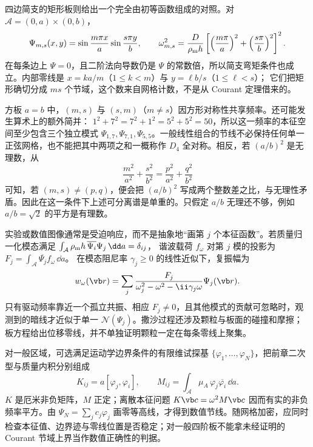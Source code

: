四边简支的矩形板则给出一个完全由初等函数组成的对照。对
\(\mathcal A=(0,a)\times(0,b)\)，
\[
 \Psi_{m,s}(x,y)
 =\sin\frac{m\pi x}{a}\sin\frac{s\pi y}{b},
 \qquad
 \omega_{m,s}^2
 =\frac{D}{\rho_{\rm m}h}
   \left[\left(\frac{m\pi}{a}\right)^2+
         \left(\frac{s\pi}{b}\right)^2\right]^2.
\]
在每条边上 \(\Psi=0\)，且二阶法向导数仍是 \(\Psi\) 的常数倍，所以简支弯矩条件也成立。内部零线是
\(x=ka/m\)（\(1\le k<m\)）与 \(y=\ell b/s\)（\(1\le\ell<s\)）；
它们把矩形确切分成 \(ms\) 个节域，这个数来自网格计数，不是从 Courant 定理借来的。

方板 \(a=b\) 中，\((m,s)\) 与 \((s,m)\)（\(m\ne s\)）因方形对称性共享频率。还可能发生算术上的额外简并：
\(1^2+7^2=7^2+1^2=5^2+5^2=50\)，所以这一频率的本征空间至少包含三个独立模式
\(\Psi_{1,7},\Psi_{7,1},\Psi_{5,5}\)。一般线性组合的节线不必保持任何单一正弦网格，也不能把其中两项之和一概称作 \(D_4\) 全对称。相反，若
\((a/b)^2\) 是无理数，从
\[
 \frac{m^2}{a^2}+\frac{s^2}{b^2}
 =\frac{p^2}{a^2}+\frac{q^2}{b^2}
\]
可知，若 \((m,s)\ne(p,q)\)，便会把 \((a/b)^2\) 写成两个整数差之比，与无理性矛盾。因此在这一条件下上述可分离谱是单重的。只假定 \(a/b\) 无理还不够，例如 \(a/b=\sqrt2\) 的平方是有理数。

实验或数值图像通常是受迫响应，而不是抽象地“画第 \(j\) 个本征函数”。若质量归一化模态满足
\(\int_{\mathcal A}\rho_{\rm m}h\,\overline{\Psi_i}\Psi_j\,\dd a=\delta_{ij}\)，
谐波载荷 \(f_\omega\) 对第 \(j\) 模的投影为
\(F_j=\int_{\mathcal A}\overline{\Psi_j}f_\omega\,\dd a\)。
在模态阻尼率 \(\gamma_j\ge0\) 的线性近似下，复振幅为
\[
 w_\omega(\vb r)
 =\sum_j\frac{F_j}{\omega_j^2-\omega^2-\ii\gamma_j\omega}
       \Psi_j(\vb r).
\]
只有驱动频率靠近一个孤立共振、相应 \(F_j\ne0\)，且其他模式的贡献可忽略时，观测到的暗线才近似于单一 \(\mathcal N(\Psi_j)\)。撒沙过程还涉及颗粒与板面的碰撞和摩擦；板方程给出位移零线，并不单独证明颗粒一定在每条零线上聚集。

对一般区域，可选满足运动学边界条件的有限维试探基
\(\{\varphi_1,\ldots,\varphi_N\}\)，把前章二次型与质量内积分别组成
\[
 K_{ij}=a[\varphi_j,\varphi_i],
 \qquad
 M_{ij}=\int_{\mathcal A}\mu_A\,
       \varphi_j\overline{\varphi_i}\,\dd a.
\]
\(K\) 是厄米非负矩阵，\(M\) 正定；离散本征问题
\(K\vb c=\omega^2M\vb c\) 因而有实的非负频率平方。由
\(\Psi_N=\sum_jc_j\varphi_j\) 画零等高线，才得到数值节线。随网格加密，应同时检查本征值、边界迹与零线位置是否稳定；对一般四阶板不能拿未经证明的 Courant 节域上界当作数值正确性的判据。

